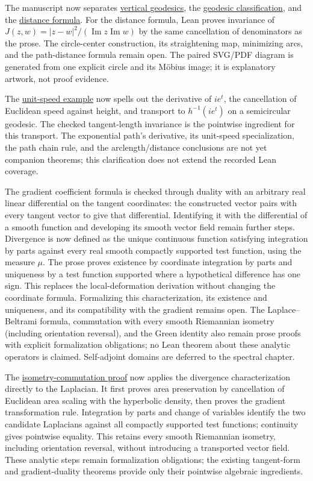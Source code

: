 The manuscript now separates \hyperref[hyperbolic.vertical-geodesics]{vertical geodesics}, the \hyperref[hyperbolic.geodesics]{geodesic classification}, and the \hyperref[hyperbolic.distance-formula]{distance formula}. For the distance formula, Lean proves invariance of $J(z,w)=|z-w|^2/(\operatorname{Im}z\operatorname{Im}w)$ by the same cancellation of denominators as the prose. The circle-center construction, its straightening map, minimizing arcs, and the path-distance formula remain open. The paired SVG/PDF diagram is generated from one explicit circle and its M\"obius image; it is explanatory artwork, not proof evidence.

The \hyperref[hyperbolic.vertical-flow]{unit-speed example} now spells out the derivative of $ie^t$, the cancellation of Euclidean speed against height, and transport to $h^{-1}(ie^t)$ on a semicircular geodesic. The checked tangent-length invariance is the pointwise ingredient for this transport. The exponential path's derivative, its unit-speed specialization, the path chain rule, and the arclength/distance conclusions are not yet companion theorems; this clarification does not extend the recorded Lean coverage.

The gradient coefficient formula is checked through duality with an arbitrary real linear differential on the tangent coordinates: the constructed vector pairs with every tangent vector to give that differential. Identifying it with the differential of a smooth function and developing its smooth vector field remain further steps. Divergence is now defined as the unique continuous function satisfying integration by parts against every real smooth compactly supported test function, using the measure $\mu$. The prose proves existence by coordinate integration by parts and uniqueness by a test function supported where a hypothetical difference has one sign. This replaces the local-deformation derivation without changing the coordinate formula. Formalizing this characterization, its existence and uniqueness, and its compatibility with the gradient remains open. The Laplace--Beltrami formula, commutation with every smooth Riemannian isometry (including orientation reversal), and the Green identity also remain prose proofs with explicit formalization obligations; no Lean theorem about these analytic operators is claimed. Self-adjoint domains are deferred to the spectral chapter.

The \hyperref[hyperbolic.laplacian-isometries]{isometry-commutation proof} now applies the divergence characterization directly to the Laplacian. It first proves area preservation by cancellation of Euclidean area scaling with the hyperbolic density, then proves the gradient transformation rule. Integration by parts and change of variables identify the two candidate Laplacians against all compactly supported test functions; continuity gives pointwise equality. This retains every smooth Riemannian isometry, including orientation reversal, without introducing a transported vector field. These analytic steps remain formalization obligations; the existing tangent-form and gradient-duality theorems provide only their pointwise algebraic ingredients.

